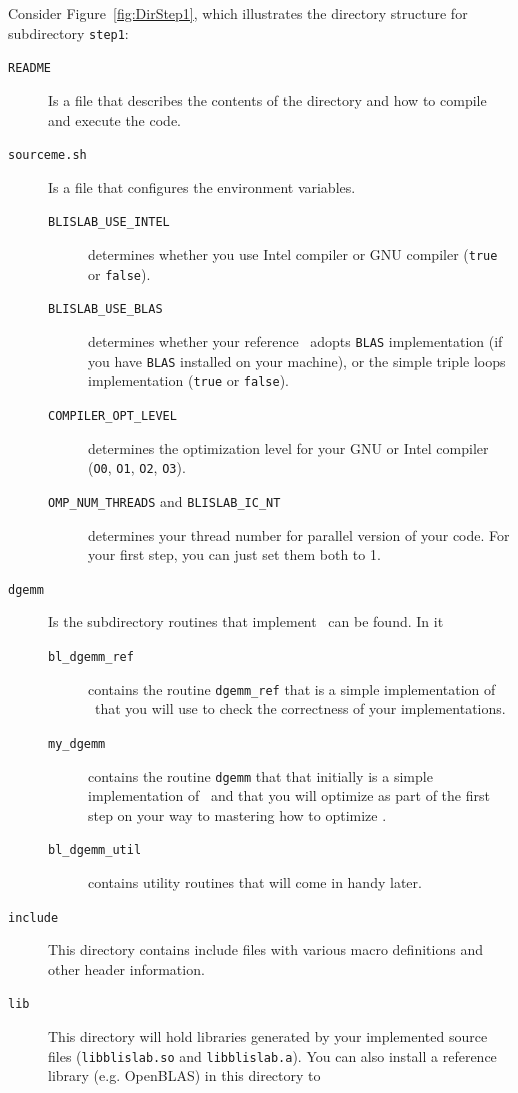 Consider Figure~\ref{fig:DirStep1}, which illustrates the directory
structure for subdirectory {\tt step1}:
\begin{description}
\item[{\tt README}]
Is a file that describes the contents of the directory and how to compile and execute the code.
\item[{\tt sourceme.sh}]
Is a file that configures the environment variables.
\begin{description}
\item[{\tt BLISLAB\_USE\_INTEL}] determines whether you use Intel compiler or GNU compiler ({\tt true} or {\tt false}).
\item[{\tt BLISLAB\_USE\_BLAS}] determines whether your reference \Gemm\ adopts {\tt BLAS} implementation (if you have {\tt BLAS} installed on your machine), or the simple triple loops implementation ({\tt true} or {\tt false}).
\item[{\tt COMPILER\_OPT\_LEVEL}] determines the optimization level for your GNU or Intel compiler ({\tt O0}, {\tt O1}, {\tt O2}, {\tt O3}).
\item[{\tt OMP\_NUM\_THREADS} and {\tt BLISLAB\_IC\_NT}] determines your thread number for parallel version of your code. For your first step, you can just set them both to 1.
\end{description}
\item[{\tt dgemm}]
Is the subdirectory routines that implement \Gemm\ can be found.
In it
\begin{description}
\item[{\tt bl\_dgemm\_ref}] contains the routine {\tt dgemm\_ref} that
  is a simple implementation of \Gemm\ that you will use to check the
  correctness of your implementations.
\item[{\tt my\_dgemm}] contains the routine {\tt dgemm} that
  that initially is a simple implementation of \Gemm\ and that you will optimize as part of the first step on your way to mastering how to optimize \Gemm.
\item[{\tt bl\_dgemm\_util}] contains utility routines that will come in handy later.
\end{description}
\item[{\tt include}]
This directory contains 
include files with various macro definitions and 
other header information.
\item[{\tt lib}] This directory will hold libraries generated by your implemented source files ({\tt libblislab.so} and {\tt libblislab.a}). You can also install a reference library (e.g. OpenBLAS) in this directory to

\end{description}
